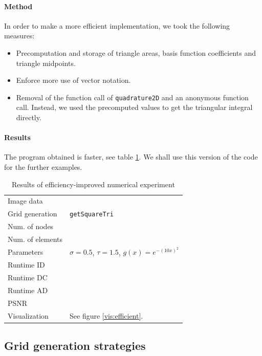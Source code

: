 \documentclass{report}
\begin{document}
\paragraph{Method}

In order to make a more efficient implementation, we took the following measures:

\begin{itemize}
    \item
    Precomputation and storage of triangle areas, basis function coefficients and triangle midpoints.
    \item 
    Enforce more use of vector notation.
    \item 
    Removal of the function call of \texttt{quadrature2D} and an anonymous function call. Instead, we used the precomputed values to get the triangular integral directly.
\end{itemize}

\paragraph{Results}

The program obtained is faster, see table \ref{res:efficient}. We shall use this version of the code for the further examples.

\begin{table}[h]
	\centering
	\begin{tabular}{|ll}
		Image data & \\
		Grid generation & \texttt{getSquareTri} \\
		Num. of nodes \\
		Num. of elements \\
		Parameters & $\sigma=0.5$, $\tau=1.5$, $g(x) = e^{-(10 x)^2}$ \\
		Runtime ID \\
		Runtime DC \\
		Runtime AD \\
		PSNR \\
		Visualization & See figure \ref{vis:efficient}.\\
	\end{tabular}
	\caption{Results of efficiency-improved numerical experiment}
	\label{res:efficient}
\end{table}

\subsection{Grid generation strategies} \label{gridgen}
\end{document}
